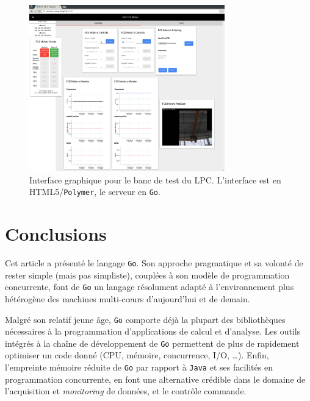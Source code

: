 \documentclass[a4paper,french]{article}
\begin{document}
\begin{figure}[h]
	\begin{center}
	\includegraphics[width=20pc]{figs/fcs-lsst.png}
	\end{center}
	\caption{\label{fig-fcs-lsst}Interface graphique pour le banc de test du
	LPC. L'interface est en HTML5/\texttt{Polymer}, le serveur en \texttt{Go}.}
\end{figure}

\section{Conclusions}

Cet article a pr\'esent\'e le langage \texttt{Go}.
Son approche pragmatique et sa volont\'e de rester simple (mais pas simpliste),
coupl\'ees \`a son mod\`ele de programmation concurrente, font de \texttt{Go} un
langage r\'esolument adapt\'e \`a l'environnement plus h\'et\'erog\`ene des
machines multi-c\oe urs d'aujourd'hui et de demain.

Malgr\'e son relatif jeune \^age, \texttt{Go} comporte d\'ej\`a la plupart des
biblioth\`eques n\'ecessaires \`a la programmation d'applications de calcul et
d'analyse.
Les outils int\'egr\'es \`a la cha\^ine de d\'eveloppement de \texttt{Go}
permettent de plus de rapidement optimiser un code donn\'e (CPU, m\'emoire,
concurrence, I/O, \ldots).
Enfin, l'empreinte m\'emoire r\'eduite de \texttt{Go} par rapport \`a
\texttt{Java} et ses facilit\'es en programmation concurrente, en font une
alternative cr\'edible dans le domaine de l'acquisition et \emph{monitoring}
de donn\'ees, et le contr\^ole commande.
\end{document}
